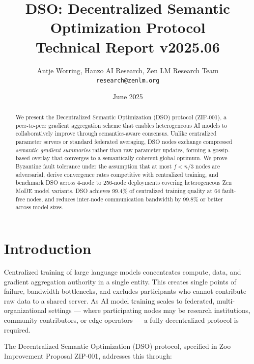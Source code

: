 \documentclass[11pt,a4paper]{article}
\title{\textbf{DSO: Decentralized Semantic Optimization Protocol}\\
\large Technical Report v2025.06}
\author{Antje Worring, Hanzo AI Research, Zen LM Research Team\\
\texttt{research@zenlm.org}}
\date{June 2025}
\begin{document}
\maketitle

\begin{abstract}
We present the Decentralized Semantic Optimization (DSO) protocol (ZIP-001), a
peer-to-peer gradient aggregation scheme that enables heterogeneous AI models to
collaboratively improve through semantics-aware consensus. Unlike centralized
parameter servers or standard federated averaging, DSO nodes exchange compressed
\emph{semantic gradient summaries} rather than raw parameter updates, forming a
gossip-based overlay that converges to a semantically coherent global optimum.
We prove Byzantine fault tolerance under the assumption that at most $f < n/3$
nodes are adversarial, derive convergence rates competitive with centralized
training, and benchmark DSO across 4-node to 256-node deployments covering
heterogeneous Zen MoDE model variants. DSO achieves 99.4\% of centralized training
quality at 64 fault-free nodes, and reduces inter-node communication bandwidth by
99.8\% or better across model sizes.
\end{abstract}

\tableofcontents
\newpage

\section{Introduction}
\label{sec:intro}

Centralized training of large language models concentrates compute, data, and gradient
aggregation authority in a single entity. This creates single points of failure,
bandwidth bottlenecks, and excludes participants who cannot contribute raw data to a
shared server. As AI model training scales to federated, multi-organizational settings —
where participating nodes may be research institutions, community contributors, or
edge operators — a fully decentralized protocol is required.

The Decentralized Semantic Optimization (DSO) protocol, specified in Zoo Improvement
Proposal ZIP-001, addresses this through:
\end{document}
